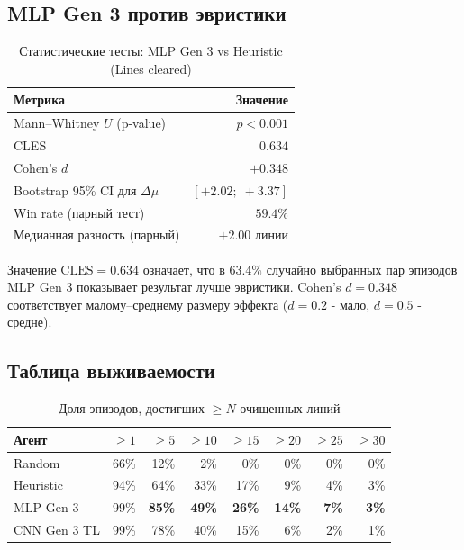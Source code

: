\documentclass[12pt, a4paper]{article}
\begin{document}
\subsection{MLP Gen 3 против эвристики}

\begin{table}[H]
  \centering
  \caption{Статистические тесты: MLP Gen 3 vs Heuristic (Lines cleared)}
  \label{tab:stat_mlp3}
  \begin{tabular}{lr}
    \toprule
    \textbf{Метрика} & \textbf{Значение} \\
    \midrule
    Mann--Whitney $U$ (p-value) & $p < 0.001$ \\
    CLES & $0.634$ \\
    Cohen's $d$ & $+0.348$ \\
    Bootstrap 95\% CI для $\Delta\mu$ & $[+2.02;\; +3.37]$ \\
    Win rate (парный тест) & $59.4\%$ \\
    Медианная разность (парный) & $+2.00$ линии \\
    \bottomrule
  \end{tabular}
\end{table}

Значение $\mathrm{CLES}=0.634$ означает, что в $63.4\%$ случайно выбранных пар эпизодов MLP Gen 3 показывает результат лучше эвристики. Cohen's $d = 0.348$ соответствует малому--среднему размеру эффекта ($d=0.2$ - мало, $d=0.5$ - средне).

\subsection{Таблица выживаемости}

\begin{table}[H]
  \centering
  \caption{Доля эпизодов, достигших $\geq N$ очищенных линий}
  \label{tab:survival}
  \begin{tabular}{lrrrrrrr}
    \toprule
    \textbf{Агент} & $\geq1$ & $\geq5$ & $\geq10$ & $\geq15$ & $\geq20$ & $\geq25$ & $\geq30$ \\
    \midrule
    Random       & 66\% & 12\% &  2\% &  0\% &  0\% &  0\% &  0\% \\
    Heuristic    & 94\% & 64\% & 33\% & 17\% &  9\% &  4\% &  3\% \\
    MLP Gen 3    & 99\% & \textbf{85\%} & \textbf{49\%} & \textbf{26\%} & \textbf{14\%} &  \textbf{7\%} &  \textbf{3\%} \\
    CNN Gen 3 TL & 99\% & 78\% & 40\% & 15\% &  6\% &  2\% &  1\% \\
    \bottomrule
  \end{tabular}
\end{table}
\end{document}
